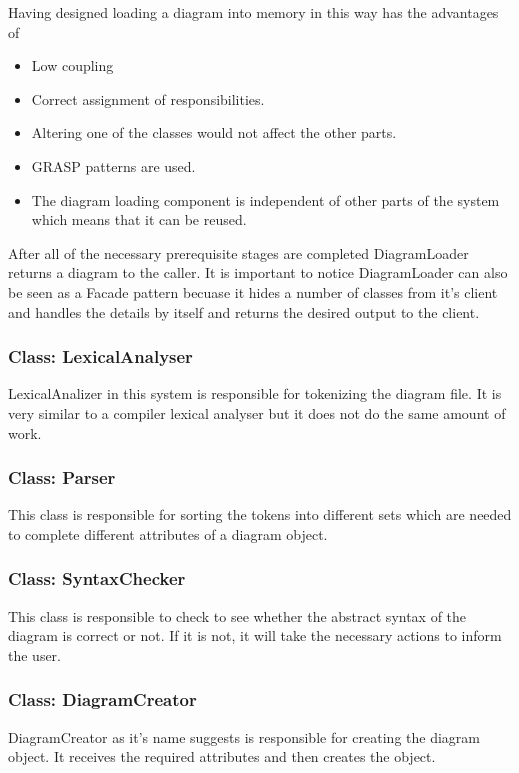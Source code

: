 \documentclass[10pt, a4paper, titlepage]{article}
\begin{document}
Having designed loading a diagram into memory in this way has the advantages of 
\begin{itemize}
\item Low coupling
\item Correct assignment of responsibilities.
\item Altering one of the classes would not affect the other parts.
\item GRASP patterns are used.
\item The diagram loading component is independent of other parts of the system which means that it can be reused.
\end{itemize}

After all of the necessary prerequisite stages are completed DiagramLoader returns a diagram to the caller. It is important to notice DiagramLoader can also be seen as a Facade pattern becuase it hides a number of classes from it's client and handles the details by itself and returns the desired output to the client.

\subsubsection{Class: LexicalAnalyser}
LexicalAnalizer in this system is responsible for tokenizing the diagram file. It is very similar to a compiler lexical analyser but it does not do the same amount of work.

\subsubsection{Class: Parser}
This class is responsible for sorting the tokens into different sets which are needed to complete different attributes of a diagram object.

\subsubsection{Class: SyntaxChecker}
This class is responsible to check to see whether the abstract syntax of the diagram is correct or not. If it is not, it will take the necessary actions to inform the user.

\subsubsection{Class: DiagramCreator}
DiagramCreator as it's name suggests is responsible for creating the diagram object. It receives the required attributes and then creates the object.
\end{document}
